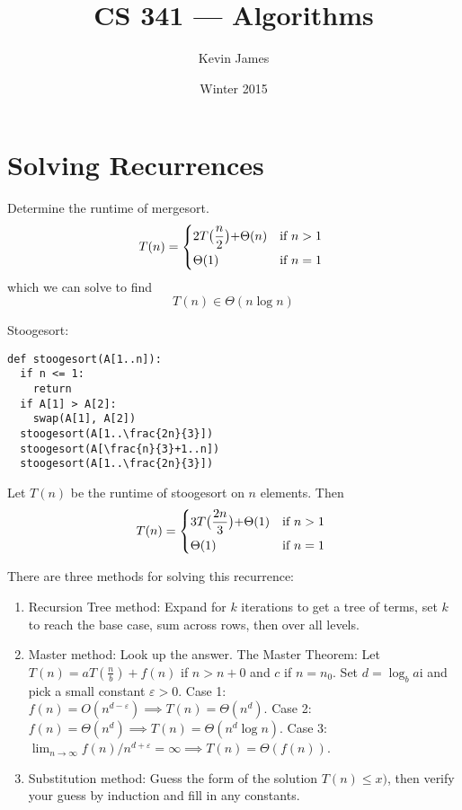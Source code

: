 \documentclass[12pt]{article}
\begin{document}
\title{CS 341 --- Algorithms}
\author{Kevin James}
\date{\vspace{-2ex}Winter 2015}
\maketitle\HRule

\tableofcontents
\newpage

\section{Solving Recurrences}
\begin{example}
Determine the runtime of mergesort.
\[ T(n) =
\begin{dcases*}
2T\bigl(\frac{n}{2}\bigl) + \Theta(n) & if $n > 1$ \\
\Theta(1) & if $n = 1$
\end{dcases*}\]
which we can solve to find \[ T(n) \in \Theta(n\log n) \]
\end{example}

\begin{definition}
Stoogesort:
\begin{verbatim}
def stoogesort(A[1..n]):
  if n <= 1:
    return
  if A[1] > A[2]:
    swap(A[1], A[2])
  stoogesort(A[1..\frac{2n}{3}])
  stoogesort(A[\frac{n}{3}+1..n])
  stoogesort(A[1..\frac{2n}{3}])
\end{verbatim}
\end{definition}

\begin{example}
Let $T(n)$ be the runtime of stoogesort on $n$ elements. Then \[ T(n) =
\begin{dcases*}
3T\bigl(\frac{2n}{3}\bigl) + \Theta(1) & if $n > 1$ \\
\Theta(1) & if $n = 1$
\end{dcases*}\]
\end{example}

There are three methods for solving this recurrence:
\begin{enumerate}
\item Recursion Tree method: Expand for $k$ iterations to get a tree of terms, set $k$ to reach the base case, sum across rows, then over all levels.
\item Master method: Look up the answer. The Master Theorem: Let $T(n) = aT(\frac{n}{b}) + f(n)$ if $n > n+0$ and $c$ if $n = n_0$. Set $d = \log_b a$i and pick a small constant $\varepsilon > 0$. Case 1: $f(n) = O(n^{d-\varepsilon}) \implies T(n) = \Theta(n^d)$. Case 2: $f(n) = \Theta(n^d) \implies T(n) = \Theta(n^d \log n)$. Case 3: $\lim_{n\to\infty} f(n) / n^{d+\varepsilon} = \infty \implies T(n) = \Theta(f(n))$.
\item Substitution method: Guess the form of the solution $T(n) \leq x)$, then verify your guess by induction and fill in any constants.
\end{enumerate}
\end{document}
